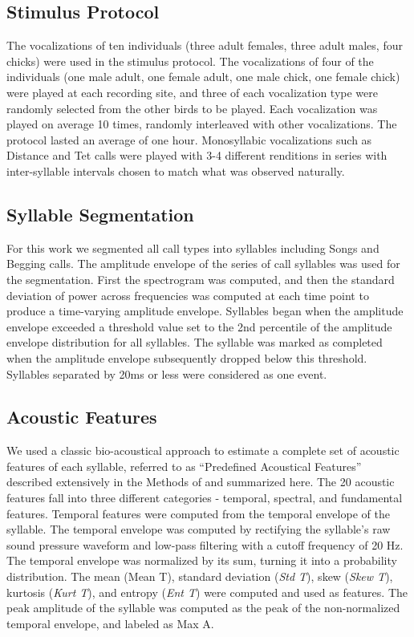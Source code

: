 \subsection{Stimulus Protocol}

    The vocalizations of ten individuals (three adult females, three adult males, four chicks) were used in the stimulus protocol. The vocalizations of four of the individuals (one male adult, one female adult, one male chick, one female chick) were played at each recording site, and three of each vocalization type were randomly selected from the other birds to be played. Each vocalization was played on average 10 times, randomly interleaved with other vocalizations. The protocol lasted an average of one hour. Monosyllabic vocalizations such as Distance and Tet calls were played with 3-4 different renditions in series with inter-syllable intervals chosen to match what was observed naturally.


\subsection{Syllable Segmentation}

For this work we segmented all call types into syllables including Songs and Begging calls. The amplitude envelope of the series of call syllables was used for the segmentation. First the spectrogram was computed, and then the standard deviation of power across frequencies was computed at each time point to produce a time-varying amplitude envelope. Syllables began when the amplitude envelope exceeded a threshold value set to the 2nd percentile of the amplitude envelope distribution for all syllables. The syllable was marked as completed when the amplitude envelope subsequently dropped below this threshold. Syllables separated by 20ms or less were considered as one event.


\subsection{Acoustic Features}

    We used a classic bio-acoustical approach to estimate a complete set of acoustic features of each syllable, referred to as “Predefined Acoustical Features” described extensively in the Methods of \cite{Elie2015b} and summarized here. The 20 acoustic features fall into three different categories - temporal, spectral, and fundamental features.
    Temporal features were computed from the temporal envelope of the syllable. The temporal envelope was computed by rectifying the syllable’s raw sound pressure waveform and low-pass filtering with a cutoff frequency of 20 Hz. The temporal envelope was normalized by its sum, turning it into a probability distribution. The mean (Mean T), standard deviation ({\em Std T}), skew ({\em Skew T}), kurtosis ({\em Kurt T}), and entropy ({\em Ent T}) were computed and used as features. The peak amplitude of the syllable was computed as the peak of the non-normalized temporal envelope, and labeled as Max A.

